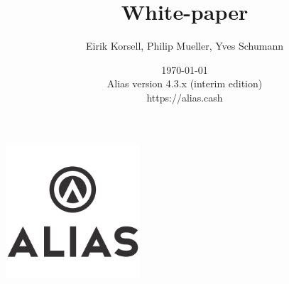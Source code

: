 \documentclass[a4paper,12pt]{article}
\title{White-paper}
\author{Eirik Korsell, Philip Mueller, Yves Schumann}
\date{\today \\
	Alias version 4.3.x (interim edition)\\
	https://alias.cash}
\begin{document}
\begin{titlingpage} %
\begin{center}
\includegraphics[height=5cm]{Images/Alias-Vertical-Black.jpg}\\ %
\vspace{4cm} %
\begin{huge} 
\textbf{\thetitle} \\
\end{huge}
\vspace{1cm}
\theauthor\\
\vspace{7cm} %
\thedate
\end{center}
\end{titlingpage}

\sffamily

\begin{spacing}{1}
    \tableofcontents
\end{spacing}

\setlength{\arrayrulewidth}{.5mm}
\setlength{\tabcolsep}{8pt}
\renewcommand{\arraystretch}{1.5}














\end{document}
